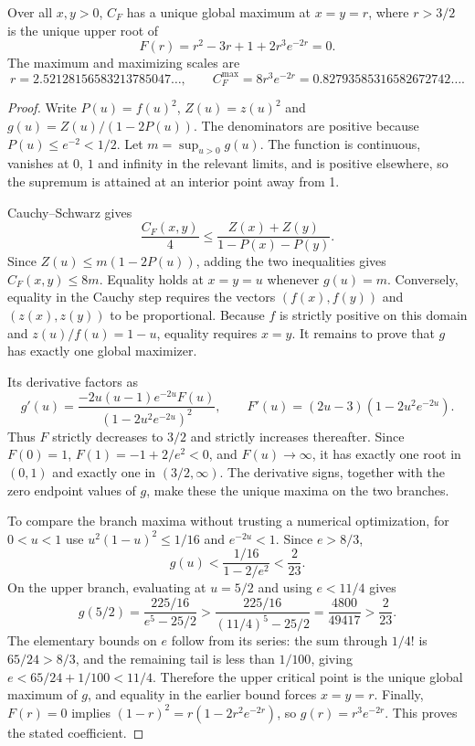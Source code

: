 \begin{theorem}
Over all $x,y>0$, $C_F$ has a unique global maximum at $x=y=r$, where $r>3/2$ is the unique upper root of
\[
F(r)=r^2-3r+1+2r^3e^{-2r}=0.
\]
The maximum and maximizing scales are
\[
r=2.52128156583213785047\ldots,\qquad
C_F^{\max}=8r^3e^{-2r}=0.82793585316582672742\ldots.
\]
\end{theorem}
\begin{proof}
Write $P(u)=f(u)^2$, $Z(u)=z(u)^2$ and $g(u)=Z(u)/(1-2P(u))$. The denominators are positive because $P(u)\le e^{-2}<1/2$. Let $m=\sup_{u>0}g(u)$. The function is continuous, vanishes at $0$, $1$ and infinity in the relevant limits, and is positive elsewhere, so the supremum is attained at an interior point away from 1.

Cauchy--Schwarz gives
\[
\frac{C_F(x,y)}4\le
\frac{Z(x)+Z(y)}{1-P(x)-P(y)}.
\]
Since $Z(u)\le m(1-2P(u))$, adding the two inequalities gives $C_F(x,y)\le8m$. Equality holds at $x=y=u$ whenever $g(u)=m$. Conversely, equality in the Cauchy step requires the vectors $(f(x),f(y))$ and $(z(x),z(y))$ to be proportional. Because $f$ is strictly positive on this domain and $z(u)/f(u)=1-u$, equality requires $x=y$. It remains to prove that $g$ has exactly one global maximizer.

Its derivative factors as
\[
g'(u)=\frac{-2u(u-1)e^{-2u}F(u)}{(1-2u^2e^{-2u})^2},\qquad
F'(u)=(2u-3)(1-2u^2e^{-2u}).
\]
Thus $F$ strictly decreases to $3/2$ and strictly increases thereafter. Since $F(0)=1$, $F(1)=-1+2/e^2<0$, and $F(u)\to\infty$, it has exactly one root in $(0,1)$ and exactly one in $(3/2,\infty)$. The derivative signs, together with the zero endpoint values of $g$, make these the unique maxima on the two branches.

To compare the branch maxima without trusting a numerical optimization, for $0<u<1$ use $u^2(1-u)^2\le1/16$ and $e^{-2u}<1$. Since $e>8/3$,
\[
g(u)<\frac{1/16}{1-2/e^2}<\frac2{23}.
\]
On the upper branch, evaluating at $u=5/2$ and using $e<11/4$ gives
\[
g(5/2)=\frac{225/16}{e^5-25/2}>
\frac{225/16}{(11/4)^5-25/2}=\frac{4800}{49417}>\frac2{23}.
\]
The elementary bounds on $e$ follow from its series: the sum through $1/4!$ is $65/24>8/3$, and the remaining tail is less than $1/100$, giving $e<65/24+1/100<11/4$. Therefore the upper critical point is the unique global maximum of $g$, and equality in the earlier bound forces $x=y=r$. Finally, $F(r)=0$ implies $(1-r)^2=r(1-2r^2e^{-2r})$, so $g(r)=r^3e^{-2r}$. This proves the stated coefficient.
\end{proof}

